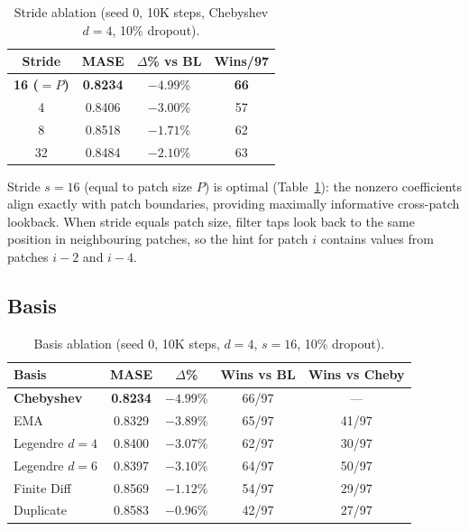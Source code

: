 \documentclass{article}
\begin{document}
\begin{table}[t]
\centering
\caption{Stride ablation (seed 0, 10K steps, Chebyshev $d=4$, 10\% dropout).}
\label{tab:stride}
\small
\begin{tabular}{cccc}
\toprule
\textbf{Stride} & \textbf{MASE} & \textbf{$\Delta$\% vs BL} & \textbf{Wins/97} \\
\midrule
\textbf{16 ($=P$)} & \textbf{0.8234} & $\mathbf{-4.99\%}$ & \textbf{66} \\
4 & 0.8406 & $-3.00\%$ & 57 \\
8 & 0.8518 & $-1.71\%$ & 62 \\
32 & 0.8484 & $-2.10\%$ & 63 \\
\bottomrule
\end{tabular}
\end{table}

Stride $s=16$ (equal to patch size $P$) is optimal (Table~\ref{tab:stride}): the nonzero coefficients align exactly with patch boundaries, providing maximally informative cross-patch lookback. When stride equals patch size, filter taps look back to the same position in neighbouring patches, so the hint for patch $i$ contains values from patches $i{-}2$ and $i{-}4$.

\subsection{Basis}

\begin{table}[t]
\centering
\caption{Basis ablation (seed 0, 10K steps, $d=4$, $s=16$, 10\% dropout).}
\label{tab:basis}
\small
\begin{tabular}{lcccc}
\toprule
\textbf{Basis} & \textbf{MASE} & \textbf{$\Delta$\%} & \textbf{Wins vs BL} & \textbf{Wins vs Cheby} \\
\midrule
\textbf{Chebyshev} & \textbf{0.8234} & $\mathbf{-4.99\%}$ & 66/97 & --- \\
EMA & 0.8329 & $-3.89\%$ & 65/97 & 41/97 \\
Legendre $d=4$ & 0.8400 & $-3.07\%$ & 62/97 & 30/97 \\
Legendre $d=6$ & 0.8397 & $-3.10\%$ & 64/97 & 50/97 \\
Finite Diff & 0.8569 & $-1.12\%$ & 54/97 & 29/97 \\
Duplicate & 0.8583 & $-0.96\%$ & 42/97 & 27/97 \\
\bottomrule
\end{tabular}
\end{table}
\end{document}
